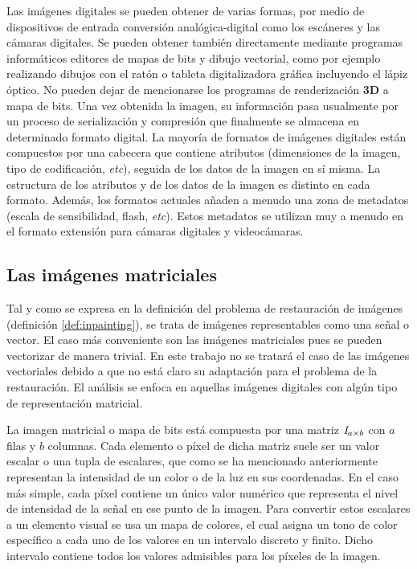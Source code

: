 Las imágenes digitales se pueden obtener de varias formas, por medio de dispositivos de entrada conversión analógica-digital como los escáneres y las cámaras digitales. Se pueden obtener tambi\'en directamente mediante programas informáticos editores de mapas de bits y dibujo vectorial, como por ejemplo realizando dibujos con el ratón o tableta digitalizadora gráfica incluyendo el lápiz óptico. No pueden dejar de mencionarse los programas de renderización \textbf{3D} a mapa de bits. Una vez obtenida la imagen, su informaci\'on pasa usualmente por un proceso de serializaci\'on y compresi\'on que finalmente se almacena en determinado formato digital. La mayoría de formatos de imágenes digitales están compuestos por una cabecera que contiene atributos (dimensiones de la imagen, tipo de codificación, \textit{etc}), seguida de los datos de la imagen en sí misma. La estructura de los atributos y de los datos de la imagen es distinto en cada formato. Además, los formatos actuales añaden a menudo una zona de metadatos (escala de sensibilidad, flash, \textit{etc}). Estos metadatos se utilizan muy a menudo en el formato extensión para cámaras digitales y videocámaras.

\subsection{Las im\'agenes matriciales}

Tal y como se expresa en la definici\'on del problema de restauraci\'on de im\'agenes (definici\'on \ref{def:inpainting}), se trata de im\'agenes representables como una señal o vector. El caso m\'as conveniente son las im\'agenes matriciales pues se pueden vectorizar de manera trivial. En este trabajo no se tratar\'a el caso de las im\'agenes vectoriales debido a que no est\'a claro su adaptaci\'on para el problema de la restauraci\'on. El análisis se enfoca en aquellas im\'agenes digitales con alg\'un tipo de representaci\'on matricial.

La imagen matricial o mapa de bits est\'a compuesta por una matriz $\mathbb{\mathit{I}}_{a \times b}$ con $a$ filas y $b$ columnas. Cada elemento o p\'ixel de dicha matriz suele ser un valor escalar o una tupla de escalares, que como se ha mencionado anteriormente representan la intensidad de un color o de la luz en sus coordenadas. En el caso más simple, cada píxel contiene un único valor numérico que representa el nivel de intensidad de la señal en ese punto de la imagen. Para convertir estos escalares a un elemento visual se usa un mapa de colores, el cual asigna un tono de color espec\'ifico a cada uno de los valores en un intervalo discreto y finito. Dicho intervalo contiene todos los valores admisibles para los p\'ixeles de la imagen.

